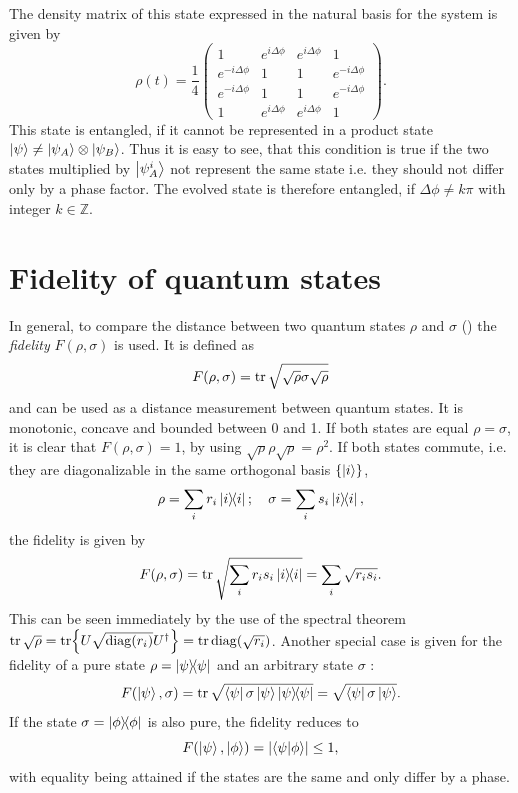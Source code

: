 The density matrix of this state expressed in the natural basis for the system is given by
\begin{equation}
  \rho(t) = \frac{1}{4}
  \begin{pmatrix}
    1 & e^{i\Delta\phi}  & e^{i\Delta\phi} & 1 \\
    e^{-i\Delta\phi} & 1 & 1  & e^{-i\Delta\phi} \\
    e^{-i\Delta\phi} & 1  & 1 & e^{-i\Delta\phi} \\
    1 & e^{i\Delta\phi} & e^{i\Delta\phi} & 1
  \end{pmatrix}.
\end{equation}
This state is entangled, if it cannot be represented in a product state $\ket{\psi} \neq \ket{\psi_A}\otimes\ket{\psi_B}$. Thus it is easy to see, that this condition is true if the two states multiplied by $\ket{\psi_A^i}$ not represent the same state i.e. they should not differ only by a phase factor.
The evolved state is therefore entangled, if $\Delta \phi \neq k\pi$ with integer $k \in \mathbb{Z}$.

\section{Fidelity of quantum states}
In general, to compare the distance between two quantum states $\rho$ and $\sigma$ () the \emph{fidelity} $F(\rho, \sigma)$ is used. It is defined as \cite[p. 409-412]{Nielsen_2010} 
\begin{equation}
  F(\rho, \sigma) = \tr \sqrt{\sqrt{\rho} \sigma \sqrt{\rho}}
\end{equation} 
and can be used as a distance measurement between quantum states. It is monotonic, concave and bounded between 0 and 1. If both states are equal $\rho = \sigma$, it is clear that $F(\rho, \sigma) = 1$, by using $\sqrt{\rho}\rho\sqrt{\rho} = \rho^2$. If both states commute, i.e. they are diagonalizable in the same orthogonal basis $\{ \ket{i} \}$, 
\begin{equation*}
  \rho = \sum_i r_i \ketbra{i}; \quad \sigma = \sum_i s_i \ketbra{i},
\end{equation*}
the fidelity is given by \cite[p. 409]{Nielsen_2010}
\begin{equation*}
  F(\rho, \sigma) = \tr \sqrt{\sum_i r_i s_i \ketbra{i}} = \sum_i \sqrt{r_i s_i}.
\end{equation*}
This can be seen immediately by the use of the spectral theorem $\tr \sqrt{\rho} = \tr{U \sqrt{\mathrm{diag}(r_i)} U^\dagger} = \tr \operatorname{diag}(\sqrt{r_i})$.
Another special case is given for the fidelity of a pure state $\rho=\ketbra{\psi}$ and an arbitrary state $\sigma$ \cite[p. 409]{Nielsen_2010}:
\begin{equation*}
  F(\ket{\psi}, \sigma) = \tr \sqrt{\bra{\psi}\sigma\ket{\psi} \ketbra{\psi}} = \sqrt{\bra{\psi}\sigma\ket{\psi}}.
\end{equation*}
If the state $\sigma = \ketbra{\phi}$ is also pure, the fidelity reduces to
\begin{equation*}
  F(\ket{\psi}, \ket{\phi}) = \left\lvert\braket{\psi}{\phi}\right\rvert \le 1,
\end{equation*}
with equality being attained if the states are the same and only differ by a phase. 

